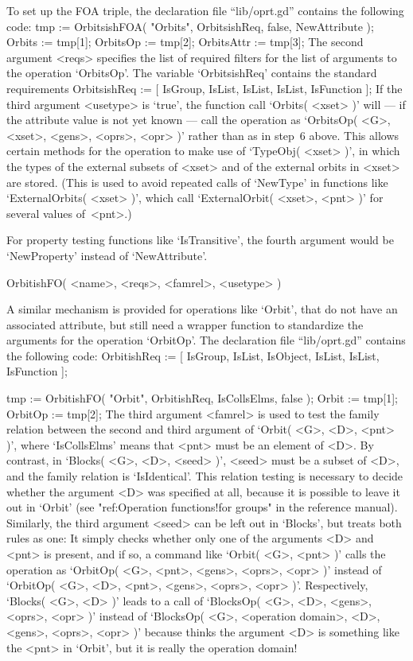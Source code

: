 To set  up the FOA  triple, the declaration file ``lib/oprt.gd'' contains
the following code:
\begintt
    tmp := OrbitsishFOA( "Orbits", OrbitsishReq, false, NewAttribute );
    Orbits     := tmp[1];
    OrbitsOp   := tmp[2];
    OrbitsAttr := tmp[3];
\endtt
The second argument <reqs> specifies the list of required filters for the
list    of   arguments  to    the  operation   `OrbitsOp'.   The variable
`OrbitsishReq' contains the standard requirements
\begintt
    OrbitsishReq := [ IsGroup, IsList,
		      IsList,
		      IsList,
		      IsFunction ];
\endtt
If the third  argument <usetype> is   `true', the function  call `Orbits(
<xset> )' will --- if  the attribute value is  not yet known --- call the
operation as `OrbitsOp( <G>, <xset>, <gens>, <oprs>, <opr> )' rather than
as in step~6 above. This allows certain methods for the operation to make
use of `TypeObj( <xset> )', in which the types of the external subsets of
<xset> and of the external orbits in <xset> are stored.  (This is used to
avoid repeated calls   of  `NewType' in  functions  like `ExternalOrbits(
<xset> )', which call `ExternalOrbit( <xset>, <pnt> )' for several values
of~<pnt>.)

For  property testing functions  like `IsTransitive', the fourth argument
would be `NewProperty' instead of `NewAttribute'.

\>OrbitishFO( <name>, <reqs>, <famrel>, <usetype> )

A similar mechanism is provided for operations  like `Orbit', that do not
have  an associated  attribute, but   still need a  wrapper function   to
standardize  the arguments for the  operation  `OrbitOp'. The declaration
file ``lib/oprt.gd'' contains the following code:
\begintt
    OrbitishReq  := [ IsGroup, IsList, IsObject,
		      IsList,
		      IsList,
		      IsFunction ];
    
    tmp := OrbitishFO( "Orbit", OrbitishReq, IsCollsElms, false );
    Orbit   := tmp[1];
    OrbitOp := tmp[2];
\endtt
The  third argument <famrel> is used  to test the family relation between
the second and  third  argument  of  `Orbit( <G>,  <D>, <pnt>   )', where
`IsCollsElms' means that <pnt> must be an element of <D>. By contrast, in
`Blocks( <G>, <D>,  <seed> )', <seed> must  be  a subset of <D>,  and the
family relation  is `IsIdentical'. This  relation testing is necessary to
decide  whether  the argument <D>  was specified  at  all,  because it is
possible to  leave  it out in  `Orbit' (see  "ref:Operation functions!for
groups" in the reference   manual). Similarly, the third  argument <seed>
can be left out  in  `Blocks', but {\GAP} treats   both rules as one:  It
simply checks whether only one of the arguments <D> and <pnt> is present,
and if so,  a command like `Orbit( <G>,  <pnt> )' calls the  operation as
`OrbitOp( <G>, <pnt>, <gens>, <oprs>, <opr>  )' instead of `OrbitOp( <G>,
<D>, <pnt>, <gens>, <oprs>, <opr> )'. Respectively,  `Blocks( <G>, <D> )'
leads to a call of `BlocksOp( <G>, <D>, <gens>,  <oprs>, <opr> )' instead
of  `BlocksOp(  <G>, <operation domain>, <D>,   <gens>,  <oprs>, <opr> )'
because {\GAP}  thinks the argument <D> is   something like the  <pnt> in
`Orbit', but it is really the operation domain!

